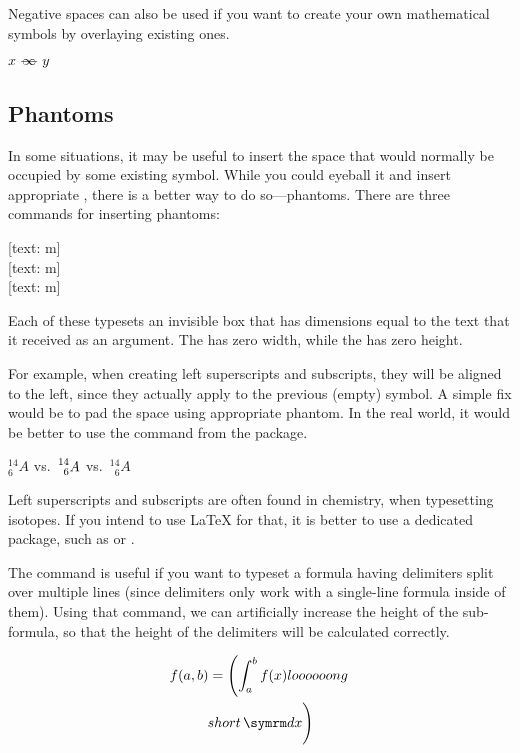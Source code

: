 Negative spaces can also be used if you want to create your own
mathematical symbols by overlaying existing ones.
\begin{example}
\NewDocumentCommand{\myrel}{}{
  \mathrel{
    -\mspace{-11mu}
    \infty{}
    \mspace{-11mu}-
  }
}
\( x \myrel y \)
\end{example}

\subsection{Phantoms}\label{sec:math_phantoms}

In some situations, it may be useful to insert the space that would normally be
occupied by some existing symbol. While you could eyeball it and insert
appropriate , there is a better way to do so---phantoms. There are
three commands for inserting phantoms:
\begin{lscommand}
  [text: m] \\
  [text: m] \\
  [text: m]
\end{lscommand}
Each of these typesets an invisible box that has dimensions equal to the text
that it received as an argument. The  has zero width, while the
 has zero height.

For example, when creating left superscripts and subscripts, they will be
aligned to the left, since they actually apply to the previous (empty) symbol.
A simple fix would be to pad the space using appropriate phantom. In the real
world, it would be better to use the  command from the
 package.
\begin{example}
\( {}^{14}_{6}A \) vs.\
\( \prescript{14}{6}A \) vs.\
\( {}^{14}_{\phantom{1}6}A \)
\end{example}
Left superscripts and subscripts are often found in chemistry, when typesetting
isotopes. If you intend to use \LaTeX{} for that, it is better to use a
dedicated package, such as \pai*{chemformula} or \pai*{mhchem}.

The \csi{vphantom} command is useful if you want to typeset a formula having
delimiters split over multiple lines (since delimiters only work with a
single-line formula inside of them). Using that command, we can artificially
increase the height of the sub-formula, so that the height of the delimiters
will be calculated correctly.
\begin{example}
\begin{multline*}
  f(a, b) = \left(
    \int_a^b f(x)
    loooooong
  \right. \\
  \left.
    \vphantom{
      \int_a^b f(x)
      loooooong
    }
    short \ud x
  \right)
\end{multline*}
\end{example}

